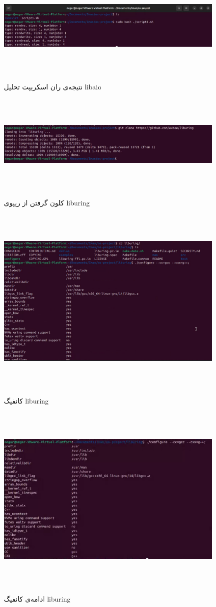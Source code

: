 ‫
‫‫‫\begin{figure}[H]
‫	‫	‫	‫    \centering
‫	‫	‫	‫    \includegraphics[width=\textwidth]{figs/19.jpg}
‫			\caption{نتیجه‌ی ران اسکریپت تحلیل libaio}
‫\end{figure}
‫
‫‫‫\begin{figure}[H]
‫	‫	‫	‫    \centering
‫	‫	‫	‫    \includegraphics[width=\textwidth]{figs/20.jpg}
‫			\caption{کلون گرفتن از ریپوی liburing}
‫\end{figure}
‫
‫‫‫\begin{figure}[H]
‫	‫	‫	‫    \centering
‫	‫	‫	‫    \includegraphics[width=\textwidth]{figs/21.jpg}
‫			\caption{کانفیگ liburing}
‫\end{figure}
‫
‫‫‫\begin{figure}[H]
‫	‫	‫	‫    \centering
‫	‫	‫	‫    \includegraphics[width=\textwidth]{figs/22.jpg}
‫			\caption{ادامه‌ی کانفیگ liburing}
‫\end{figure}
